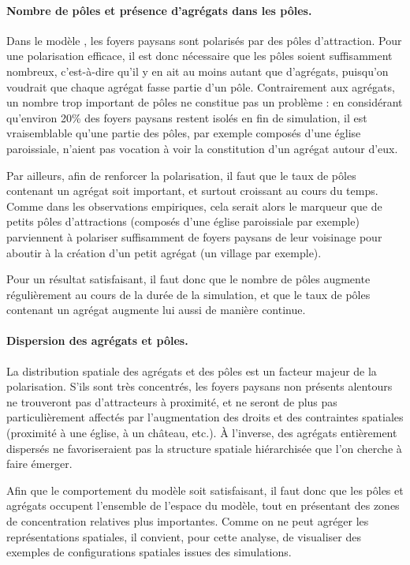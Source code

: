 \paragraph{Nombre de pôles et présence d'agrégats dans les pôles.}\label{par:nb-poles}

Dans le modèle \simfeodal{}, les foyers paysans sont polarisés par des pôles d'attraction.
Pour une polarisation efficace, il est donc nécessaire que les pôles soient suffisamment nombreux, c'est-à-dire qu'il y en ait au moins autant que d'agrégats, puisqu'on voudrait que chaque agrégat fasse partie d'un pôle.
Contrairement aux agrégats, un nombre trop important de pôles ne constitue pas un problème :
	en considérant qu'environ 20\% des foyers paysans restent isolés en fin de simulation, il est vraisemblable qu'une partie des pôles, par exemple composés d'une église paroissiale, n'aient pas vocation à voir la constitution d'un agrégat autour d'eux.

Par ailleurs, afin de renforcer la polarisation, il faut que le taux de pôles contenant un agrégat soit important, et surtout croissant au cours du temps.
Comme dans les observations empiriques, cela serait alors le marqueur que de petits pôles d'attractions (composés d'une église paroissiale par exemple) parviennent à polariser suffisamment de foyers paysans de leur voisinage pour aboutir à la création d'un petit agrégat (un village par exemple).

Pour un résultat satisfaisant, il faut donc que le nombre de pôles augmente régulièrement au cours de la durée de la simulation, et que le taux de pôles contenant un agrégat augmente lui aussi de manière continue.

\paragraph{Dispersion des agrégats et pôles.}\label{par:polarisation-dispersion}

La distribution spatiale des agrégats et des pôles est un facteur majeur de la polarisation.
S'ils sont très concentrés, les foyers paysans non présents alentours ne trouveront pas d'attracteurs à proximité, et ne seront de plus pas particulièrement affectés par l'augmentation des droits et des contraintes spatiales (proximité à une église, à un château, etc.).
À l'inverse, des agrégats entièrement dispersés ne favoriseraient pas la structure spatiale hiérarchisée que l'on cherche à faire émerger.

Afin que le comportement du modèle soit satisfaisant, il faut donc que les pôles et agrégats occupent l'ensemble de l'espace du modèle, tout en présentant des zones de concentration relatives plus importantes.
Comme on ne peut agréger les représentations spatiales, il convient, pour cette analyse, de visualiser des exemples de configurations spatiales issues des simulations.


